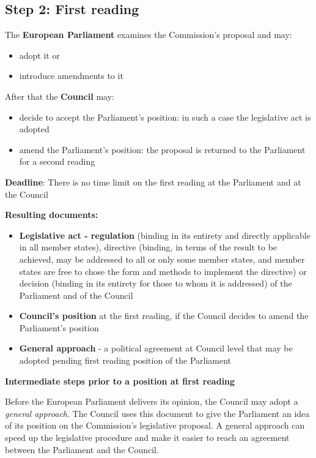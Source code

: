\subsection{Step 2: First reading}
The \textbf{European Parliament} examines the Commission's proposal and may:
\begin{itemize}
\item adopt it or
\item introduce amendments to it
\end{itemize}
\clearpage
After that the \textbf{Council} may:
\begin{itemize}
\item decide to accept the Parliament's position: in such a case the legislative act is adopted
\item amend the Parliament's position: the proposal is returned to the Parliament for a second reading
\end{itemize}

\textbf{Deadline}: There is no time limit on the first reading at the Parliament and at the Council

\textbf{Resulting documents:}
\begin{itemize}
\item \textbf{Legislative act - regulation} (binding in its entirety and directly applicable in all member states), directive (binding, in terms of the result to be achieved, may be addressed to all or only some member states, and member states are free to chose the form and methods to implement the directive) or decision (binding in its entirety for those to whom it is addressed) of the Parliament and of the Council
\item \textbf{Council's position} at the first reading, if the Council decides to amend the Parliament's position
\item \textbf{General approach} - a political agreement at Council level that may be adopted pending first reading position of the Parliament 
\end{itemize}

\textbf{Intermediate steps prior to a position at first reading}

Before the European Parliament delivers its opinion, the Council may adopt a \textit{general approach}. The Council uses this document to give the Parliament an idea of its position on the Commission's legislative proposal. A general approach can speed up the legislative procedure and make it easier to reach an agreement between the Parliament and the Council. 

